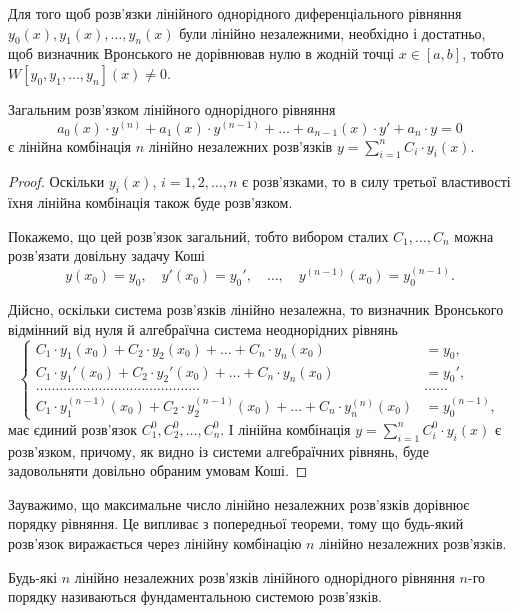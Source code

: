 \begin{theorem}
	Для того щоб розв'язки лінійного однорідного диференціального рівняння $y_0(x), y_1(x), \ldots, y_n(x)$ були лінійно незалежними, необхідно і достатньо, щоб визначник Вронського не дорівнював нулю в жодній точці $x \in [a,b]$, тобто $W[y_0, y_1, \ldots, y_n](x) \ne 0$.
\end{theorem}

\begin{theorem}
	Загальним розв'язком лінійного однорідного рівняння
	\begin{equation*}
		a_0(x) \cdot y^{(n)} + a_1(x) \cdot y^{(n-1)} + \ldots + a_{n-1}(x) \cdot y' + a_n \cdot y = 0
	\end{equation*}
 	є лінійна комбінація $n$ лінійно незалежних розв'язків $y = \sum_{i = 1}^n C_i \cdot y_i(x)$.
\end{theorem}

\begin{proof}
	Оскільки $y_i(x)$, $i = 1, 2, \ldots, n$ є розв'язками, то в силу третьої властивості їхня лінійна комбінація також буде розв'язком. \parvskip

	Покажемо, що цей розв'язок загальний, тобто вибором сталих $C_1, \ldots, C_n$ можна розв'язати довільну задачу Коші
	\begin{equation*}
		y(x_0) = y_0, \quad y'(x_0) = y_0', \quad \ldots, \quad y^{(n - 1)}(x_0) = y_0^{(n - 1)}.
	\end{equation*}

	Дійсно, оскільки система розв'язків лінійно незалежна, то визначник Вронського відмінний від нуля й алгебраїчна система неоднорідних рівнянь
	\begin{equation*}
		\left\{ \begin{aligned}
			C_1 \cdot y_1(x_0) + C_2 \cdot y_2(x_0) + \ldots + C_n \cdot y_n(x_0) &= y_0, \\
			C_1 \cdot y_1'(x_0) + C_2 \cdot y_2'(x_0) + \ldots + C_n \cdot y_n(x_0) &= y_0', \\
			\ldots \ldots \ldots \ldots \ldots \ldots \ldots \ldots \ldots \ldots \ldots \ldots \ldots \ldots & \ldots \ldots \\
			C_1 \cdot y_1^{(n - 1)}(x_0) + C_2 \cdot y_2^{(n - 1)}(x_0) + \ldots + C_n \cdot y_n^{(n)}(x_0) &= y_0^{(n - 1)},
		\end{aligned} \right.
	\end{equation*}
	має єдиний розв'язок $C_1^0, C_2^0, \ldots, C_n^0$. І лінійна комбінація $y = \sum_{i = 1}^n C_i^0 \cdot y_i(x)$ є розв'язком, причому, як видно із системи алгебраїчних рівнянь, буде задовольняти довільно обраним умовам Коші.
\end{proof}

Зауважимо, що максимальне число лінійно незалежних розв'язків дорівнює порядку рівняння. Це випливає з попередньої теореми, тому що будь-який розв'язок виражається через лінійну комбінацію $n$ лінійно незалежних розв'язків.

\begin{definition}
	Будь-які $n$ лінійно незалежних розв'язків лінійного однорідного рівняння $n$-го порядку називаються фундаментальною системою розв'язків.
\end{definition}